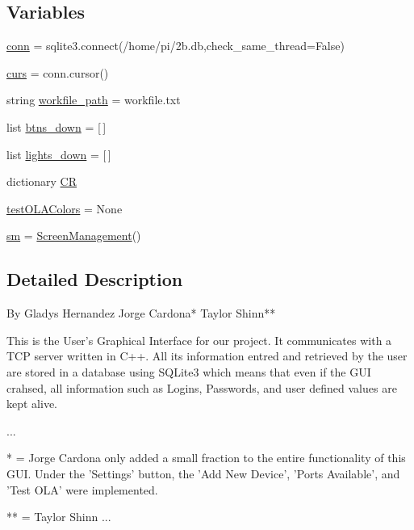 \subsection*{Variables}
\begin{DoxyCompactItemize}
\item 
\hyperlink{namespacenewGUI_a91dbb31105fb358875b6fa3553cab079}{conn} = sqlite3.\+connect(\textquotesingle{}/home/pi/2b.\+db\textquotesingle{},check\+\_\+same\+\_\+thread=\+False)
\item 
\hyperlink{namespacenewGUI_a5544cf625f6efca1ade3fecd19cae96b}{curs} = conn.\+cursor()
\item 
string \hyperlink{namespacenewGUI_aa6053557debf9b425afe60392b0a7ecb}{workfile\+\_\+path} = \textquotesingle{}workfile.\+txt\textquotesingle{}
\item 
list \hyperlink{namespacenewGUI_a63d65d01529f766bc8902211966856f8}{btns\+\_\+down} = \mbox{[}$\,$\mbox{]}
\item 
list \hyperlink{namespacenewGUI_a2d3315806a79ccd081272c11632e8287}{lights\+\_\+down} = \mbox{[}$\,$\mbox{]}
\item 
dictionary \hyperlink{namespacenewGUI_a0d1b5c5572fb3279b11bca7a9e927686}{CR}
\item 
\hyperlink{namespacenewGUI_a848be0fa44db58426e494eeac159d0be}{test\+O\+L\+A\+Colors} = None
\item 
\hyperlink{namespacenewGUI_aead1b4e98dbd3c8dadf69c1e77f1f15a}{sm} = \hyperlink{classnewGUI_1_1ScreenManagement}{Screen\+Management}()
\end{DoxyCompactItemize}


\subsection{Detailed Description}
\begin{DoxyVerb}By Gladys Hernandez
   Jorge Cardona*
   Taylor Shinn**

This is the User's Graphical Interface for our project.
It communicates with a TCP server written in C++.
All its information entred and retrieved by the user
are stored in a database using SQLite3 which means that even
if the GUI crahsed, all information such as Logins, Passwords, and
user defined values are kept alive.

...

* = Jorge Cardona only added a small fraction to the entire functionality 
of this GUI. Under the 'Settings' button, the 'Add New Device', 'Ports Available',
and 'Test OLA' were implemented.

** = Taylor Shinn ...\end{DoxyVerb}
 


